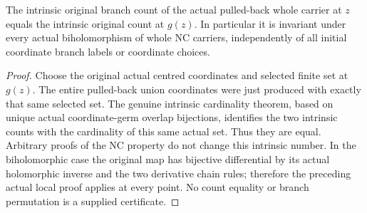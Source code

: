 \begin{theorem}
\label{hir:general-nc-biholomorphic-intrinsic-multiplicity}
\leanok
{}
The intrinsic original branch count of the actual pulled-back whole
carrier at $z$ equals the intrinsic original count at $g(z)$. In
particular it is invariant under every actual biholomorphism of
whole NC carriers, independently of all initial coordinate branch
labels or coordinate choices.
\end{theorem}
\begin{proof}
Choose the original actual centred coordinates and selected finite
set at $g(z)$. The entire pulled-back union coordinates were just
produced with exactly that same selected set. The genuine intrinsic
cardinality theorem, based on unique actual coordinate-germ overlap
bijections, identifies the two intrinsic counts with the cardinality
of this same actual set. Thus they are equal. Arbitrary proofs of
the NC property do not change this intrinsic number. In the
biholomorphic case the original map has bijective differential by
its actual holomorphic inverse and the two derivative chain rules;
therefore the preceding actual local proof applies at every point.
No count equality or branch permutation is a supplied certificate.
\end{proof}

